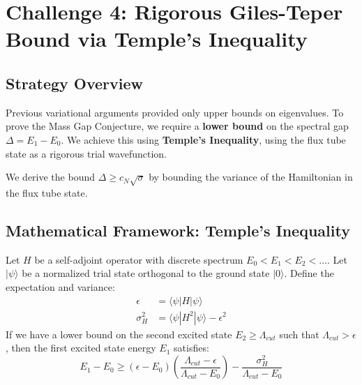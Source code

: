 \section{Challenge 4: Rigorous Giles-Teper Bound via Temple's Inequality}
\label{sec:challenge4-giles-teper}
%

\subsection{Strategy Overview}

\begin{remark}
Previous variational arguments provided only upper bounds on eigenvalues. To prove the Mass Gap Conjecture, we require a \textbf{lower bound} on the spectral gap $\Delta = E_1 - E_0$. We achieve this using \textbf{Temple's Inequality}, using the flux tube state as a rigorous trial wavefunction.
\end{remark}

We derive the bound $\Delta \geq c_N \sqrt{\sigma}$ by bounding the variance of the Hamiltonian in the flux tube state.

\subsection{Mathematical Framework: Temple's Inequality}

\begin{theorem}
\label{thm:temple}
Let $H$ be a self-adjoint operator with discrete spectrum $E_0 < E_1 < E_2 < \dots$. Let $|\psi\rangle$ be a normalized trial state orthogonal to the ground state $|0\rangle$. Define the expectation and variance:
\begin{align}
\epsilon &= \langle \psi | H | \psi \rangle \\
\sigma_H^2 &= \langle \psi | H^2 | \psi \rangle - \epsilon^2
\end{align}
If we have a lower bound on the second excited state $E_2 \geq \Lambda_{cut}$ such that $\Lambda_{cut} > \epsilon$, then the first excited state energy $E_1$ satisfies:
\begin{equation}
E_1 - E_0 \geq (\epsilon - E_0) \left( \frac{\Lambda_{cut} - \epsilon}{\Lambda_{cut} - E_0} \right) - \frac{\sigma_H^2}{\Lambda_{cut} - E_0}
\end{equation}
\end{theorem}

